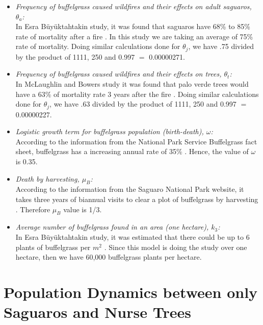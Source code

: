 \documentclass[a4paper]{article}
\begin{document}
\begin{itemize}
\item \textit{Frequency of buffelgrass caused wildfires and their effects on adult saguaros, $\theta_a$:}\\
In Esra Büyüktahtakin study, it was found that saguaros have 68\% to 85\% rate of mortality after a fire \cite{buyuktahtakin2014invasive}. In this study we are taking an average of 75\% rate of mortality. Doing similar calculations done for $\theta_j$, we have .75 divided by the product of 1111, 250 and 0.997 $=$ 0.00000271.

\item \textit{Frequency of buffelgrass caused wildfires and their effects on trees, $\theta_t$:}\\
In McLaughlin and Bowers study it was found that palo verde trees would have a 63\% of mortality rate 3 years after the fire \cite{FireEffects}. Doing similar calculations done for $\theta_j$, we have .63 divided by the product of 1111, 250 and 0.997 $=$ 0.00000227.

\item \textit{Logistic growth term for buffelgrass population (birth-death), $\omega$:}\\
According to the information from the  National Park Service Buffelgrass fact sheet, buffelgrass has a increasing annual rate of 35\% \cite{NPSbuffelFact}. Hence, the value of $\omega$ is 0.35. 

\item \textit{Death by harvesting, $\mu_B$:}\\
According to the information from the Saguaro National Park website, it takes three years of biannual visits to clear a plot of buffelgrass by harvesting \cite{NPSbuffel}. Therefore $\mu_B$ value is 1/3.

\item \textit{Average number of buffelgrass found in an area (one hectare), $k_3$:}\\
In Esra Büyüktahtakin study, it was estimated that there could be up to 6 plants of buffelgrass per $m^2$ \cite{buyuktahtakin2014invasive}. Since this model is doing the study over one hectare, then we have 60,000 buffelgrass plants per hectare.
\end{itemize}



\section{Population Dynamics between only Saguaros and Nurse Trees}
\end{document}
